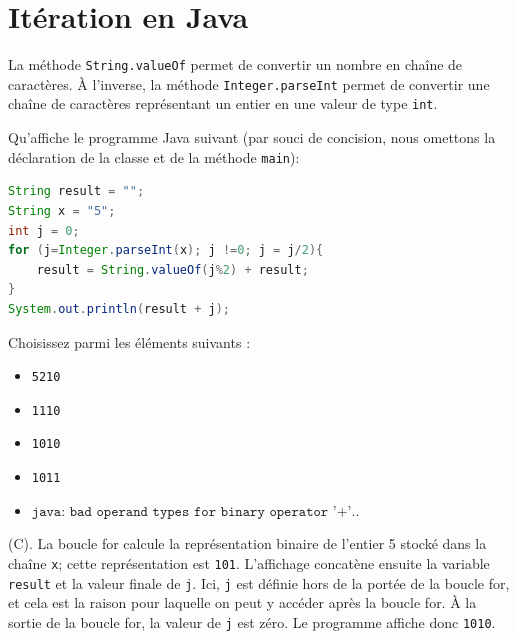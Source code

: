 \section{Itération en Java}
\begin{Exercice}[5 minutes]

    \begin{conseil}
La méthode \lstinline{String.valueOf} permet de convertir un nombre en chaîne de caractères. À l'inverse, la méthode \lstinline{Integer.parseInt} permet de convertir une chaîne de caractères représentant un entier en une valeur de type \texttt{int}.    \end{conseil}

Qu'affiche le programme Java suivant (par souci de concision, nous omettons la déclaration de la classe et de la méthode \texttt{main}):
\begin{lstlisting}[language=Java]
String result = "";
String x = "5";
int j = 0; 
for (j=Integer.parseInt(x); j !=0; j = j/2){
    result = String.valueOf(j%2) + result;
}
System.out.println(result + j);
\end{lstlisting}
Choisissez parmi les éléments suivants :
       
    \begin{itemize}
    \item[(A)] \texttt{5210}
    \item[(B)] \texttt{1110}
    \item[(C)] \texttt{1010}
    \item[(D)] \texttt{1011}
    \item[(E)] \(\texttt{java: bad operand types for binary operator '+'..}\)
\end{itemize}
\begin{solution}
    (C). La boucle for calcule la représentation binaire de l'entier 5 stocké dans la chaîne \texttt{x}; cette représentation est \texttt{101}. L'affichage concatène ensuite la variable \texttt{result} et la valeur finale de \texttt{j}. Ici, \texttt{j} est définie hors de la portée de la boucle for, et cela est la raison pour laquelle on peut y accéder après la boucle for. À la sortie de la boucle for, la valeur de \texttt{j} est zéro. Le programme affiche donc \texttt{1010}.
\end{solution}
\end{Exercice}

